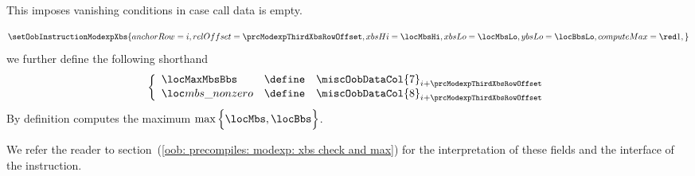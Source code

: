 \begin{description}
\begin{description}
\[				\]
				\saNote{} This imposes vanishing conditions in case call data is empty.
			\item[\underline{Setting \oobMod{} values and defining shorthands:}] 
				\[
					\setOobInstructionModexpXbs {
						anchorRow  = i         ,
						relOffset  = \prcModexpThirdXbsRowOffset   ,
						xbsHi      = \locMbsHi ,
						xbsLo      = \locMbsLo ,
						ybsLo      = \locBbsLo ,
						computeMax = \one      ,
						}
				\]
				we further define the following shorthand
				\[
					\left\{ \begin{array}{lcl}
						\locMaxMbsBbs    & \define & \miscOobDataCol{7} _ {i + \prcModexpThirdXbsRowOffset} \\
						\locMbsIsNonzero & \define & \miscOobDataCol{8} _ {i + \prcModexpThirdXbsRowOffset} \\
					\end{array} \right.
				\]
				\saNote{} By definition \locMaxMbsBbs{} computes the maximum $\max \Big \{ \locMbs, \locBbs \Big \} $.
		\end{description}
	\end{description}
	We refer the reader to section~(\ref{oob: precompiles: modexp: xbs check and max}) for the interpretation of these fields and the interface of the \oobInstModexpXbs{} instruction. 


